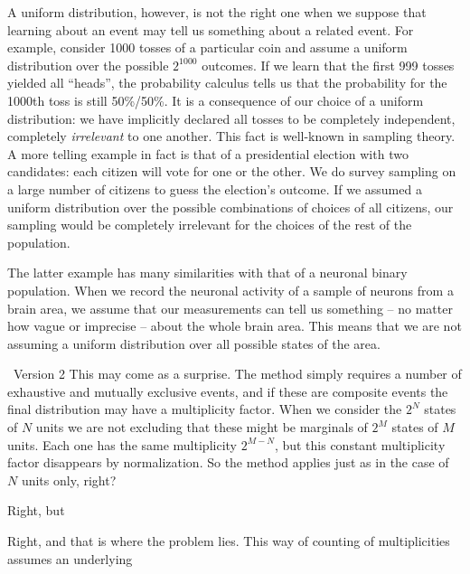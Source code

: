 \documentclass{article}
\theoremstyle{remark}
\theoremstyle{innote}
\renewcommand*{\|}{\mathpunct{|}}%
\theoremstyle{simple}
\newcommand*{\puzzle}{{\fontencoding{U}\fontfamily{fontawesometwo}\selectfont\symbol{225}}}
\newcommand{\mynote}[1]{ {\color{notecolour}\puzzle\ #1}}
\begin{document}
A uniform distribution, however, is not the right one when we suppose that
learning about an event may tell us something about a related event. For
example, consider 1000 tosses of a particular coin and assume a uniform
distribution over the possible $2^{1000}$ outcomes. If we learn that the
first 999 tosses yielded all \enquote{heads}, the probability calculus
tells us that the probability for the 1000th toss is still 50\%/50\%. It
is a consequence of our choice of a uniform distribution: we have
implicitly declared all tosses to be completely independent, completely
\emph{irrelevant} to one another. This fact is well-known in sampling
theory. A more telling example in fact is that of a presidential election
with two candidates: each citizen will vote for one or the other. We do
survey sampling on a large number of citizens to guess the election's
outcome. If we assumed a uniform distribution over the possible
combinations of choices of all citizens, our sampling would be completely
irrelevant for the choices of the rest of the population.




The latter example has many similarities with that of a neuronal binary
population. When we record the neuronal activity of a sample of neurons from a
brain area, we assume that our measurements can tell us something -- no
matter how vague or imprecise -- about the whole brain area. This means
that we are not assuming a uniform distribution over all possible states of
the area.




\mynote{Version 2}
This may come as a surprise. The method simply requires a number of
exhaustive and mutually exclusive events, and if these are composite events
the final distribution may have a multiplicity factor. When we consider the
$2^{N}$ states of $N$ units we are not excluding that these might be
marginals of $2^{M}$ states of $M$ units. Each one has the same
multiplicity $2^{M-N}$, but this constant multiplicity factor disappears
by normalization. So the method applies just as in the case of $N$ units
only, right?

Right, but 

Right, and that is where the problem lies. This way of counting of
multiplicities assumes an underlying 
\end{document}
